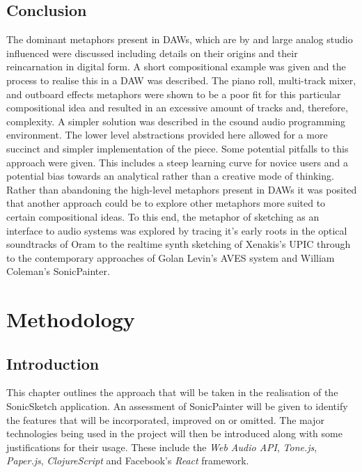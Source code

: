 \documentclass[12pt]{report}
\begin{document}
\chapter{Conclusion}
\label{sec:org9f3a411}
The dominant metaphors present in DAWs, which are by and large analog studio
influenced were discussed including details on their origins and their
reincarnation in digital form. A short compositional example was given and the
process to realise this in a DAW was described. The piano roll, multi-track
mixer, and outboard effects metaphors were shown to be a poor fit for this
particular compositional idea and resulted in an excessive amount of tracks and,
therefore, complexity. A simpler solution was described in the csound audio
programming environment. The lower level abstractions provided here allowed for
a more succinct and simpler implementation of the piece. Some potential pitfalls
to this approach were given. This includes a steep learning curve for novice
users and a potential bias towards an analytical rather than a creative mode of
thinking. Rather than abandoning the high-level metaphors present in DAWs it was
posited that another approach could be to explore other metaphors more suited to
certain compositional ideas. To this end, the metaphor of sketching as an
interface to audio systems was explored by tracing it's early roots in the
optical soundtracks of Oram to the realtime synth sketching of Xenakis's UPIC
through to the contemporary approaches of Golan Levin's AVES system and William
Coleman's SonicPainter.

\newpage
\part{Methodology}
\label{sec:org30c50d3}
\chapter{Introduction}
\label{sec:org333e3b4}
This chapter outlines the approach that will be taken in the realisation of the
SonicSketch application. An assessment of SonicPainter will be given to identify
the features that will be incorporated, improved on or omitted. The major
technologies being used in the project will then be introduced along with some
justifications for their usage. These include the \emph{Web Audio API}, \emph{Tone.js},
\emph{Paper.js}, \emph{ClojureScript} and Facebook's \emph{React} framework.
\end{document}
